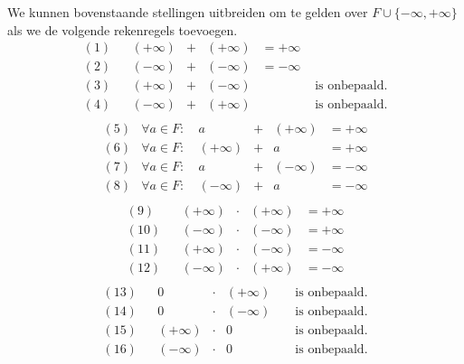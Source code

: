 \documentclass[main.tex]{subfiles}
\begin{document}
\begin{st}
  We kunnen bovenstaande stellingen uitbreiden om te gelden over $F\cup\{ -\infty,+\infty\}$ als we de volgende rekenregels toevoegen.
  \[
  \begin{array}{crccccl}
    (1) &                        & (+\infty) &+    & (+\infty) &= +\infty\\
    (2) &                        & (-\infty) &+    & (-\infty) &= -\infty\\
    (3) &                        & (+\infty) &+    & (-\infty) & & \text{ is onbepaald.} \\
    (4) &                        & (-\infty) &+    & (+\infty) & & \text{ is onbepaald.} \\
  \end{array}
  \]
  \[
  \begin{array}{crccccl}
    (5) & \forall a \in F:\        & a         &+    & (+\infty) &= + \infty \\
    (6) & \forall a \in F:\        & (+\infty) &+    & a         &= + \infty \\
    (7) & \forall a \in F:\        & a         &+    & (-\infty) &= - \infty \\
    (8) & \forall a \in F:\        & (-\infty) &+    & a         &= - \infty \\
  \end{array}
  \]
  \[
  \begin{array}{crccccl}
    (9) &                          & (+\infty) &\cdot& (+\infty) &= +\infty\\
    (10) &                          & (-\infty) &\cdot& (-\infty) &= +\infty\\
    (11) &                          & (+\infty) &\cdot& (-\infty) &= -\infty\\
    (12) &                          & (-\infty) &\cdot& (+\infty) &= -\infty\\
  \end{array}
  \]
  \[
  \begin{array}{crccccl}
    (13) &                          & 0         &\cdot& (+\infty) & & \text{ is onbepaald.} \\
    (14) &                          & 0         &\cdot& (-\infty) & & \text{ is onbepaald.} \\
    (15) &                          & (+\infty) &\cdot& 0         & & \text{ is onbepaald.} \\
    (16) &                          & (-\infty) &\cdot& 0         & & \text{ is onbepaald.} \\

\end{array}\]
\end{st}
\end{document}
